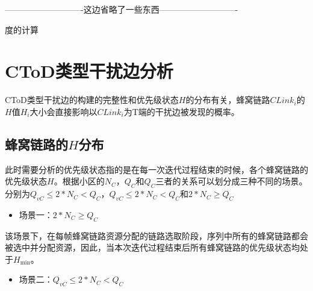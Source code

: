 \documentclass[figurelist,tablelist,algorithmlist,nomlist,masters]{seuthesix}
\begin{document}
	
	
	
	
	
	
	
	
	----------------------------这边省略了一些东西----------------------------
	
	度的计算
	
	\section{CToD类型干扰边分析}
	CToD类型干扰边的构建的完整性和优先级状态${H}$的分布有关，蜂窝链路${CLink_i}$的${H}$值${H_i}$大小会直接影响以${CLink_i}$为T端的干扰边被发现的概率。
	
	\subsection{蜂窝链路的${H}$分布}
	此时需要分析的优先级状态指的是在每一次迭代过程结束的时候，各个蜂窝链路的优先级状态${H}$。根据小区的$N_C$，$Q_C$和$Q_C$三者的关系可以划分成三种不同的场景。分别为$Q_{vC} \le 2*N_C < Q_C$，$Q_{vC} \le 2*N_C < Q_C$和$2*N_C \ge Q_C$
	
	\begin{itemize}
		\item 场景一：$2*N_C \ge Q_C$
	\end{itemize}
	
	该场景下，在每帧蜂窝链路资源分配的链路选取阶段，序列中所有的蜂窝链路都会被选中并分配资源，因此，当本次迭代过程结束后所有蜂窝链路的优先级状态均处于${H_{\min }}$。
	
	\begin{itemize}
		\item 场景二：$Q_{vC} \le 2*N_C < Q_C$
	\end{itemize}
	
\end{document}
